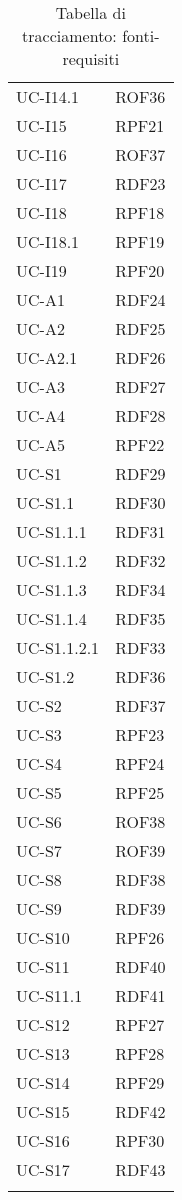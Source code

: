 \begin{longtable}{| p{5cm} | p{5cm} |}
		\rowcolor{LightGray}
		UC-I14.1 & ROF36 \\
		UC-I15 & RPF21 \\
		\rowcolor{LightGray}
		UC-I16 & ROF37 \\
		UC-I17 & RDF23\\
		\rowcolor{LightGray}
		UC-I18 & RPF18\\
		UC-I18.1 & RPF19 \\
		\rowcolor{LightGray}
		UC-I19 & RPF20 \\
		UC-A1 & RDF24\\
		\rowcolor{LightGray}
		UC-A2 & RDF25 \\
		UC-A2.1 & RDF26 \\
		\rowcolor{LightGray}
		UC-A3 & RDF27\\
		UC-A4 & RDF28 \\
		\rowcolor{LightGray}
		UC-A5 & RPF22\\
		UC-S1 & RDF29 \\
		\rowcolor{LightGray}
		UC-S1.1 & RDF30\\
		UC-S1.1.1 & RDF31\\
		\rowcolor{LightGray}
		UC-S1.1.2 & RDF32\\
		UC-S1.1.3 & RDF34\\%
		\rowcolor{LightGray}
		UC-S1.1.4 & RDF35\\%
		UC-S1.1.2.1 & RDF33\\
		\rowcolor{LightGray}
		UC-S1.2 & RDF36\\
		UC-S2 & RDF37\\
		\rowcolor{LightGray}
		UC-S3 & RPF23\\
		UC-S4 & RPF24\\
		\rowcolor{LightGray}
		UC-S5 & RPF25 \\
		UC-S6 & ROF38 \\
		\rowcolor{LightGray}
		UC-S7 & ROF39 \\
		UC-S8 & RDF38 \\
		\rowcolor{LightGray}
		UC-S9 & RDF39 \\
		UC-S10 & RPF26 \\
		\rowcolor{LightGray}
		UC-S11 & RDF40 \\
		UC-S11.1 & RDF41 \\
		\rowcolor{LightGray}
		UC-S12 & RPF27 \\
		UC-S13 & RPF28 \\
		\rowcolor{LightGray}
		UC-S14 & RPF29 \\ 
		UC-S15 & RDF42\\
		\rowcolor{LightGray}
		UC-S16 & RPF30\\		
		UC-S17 & RDF43\\%
		\hline
		\caption{Tabella di tracciamento: fonti-requisiti}
\end{longtable}
